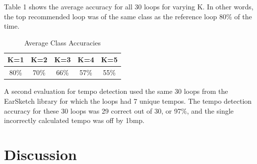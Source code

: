 \documentclass{article}
\begin{document}
Table 1 shows the average accuracy for all 30 loops for varying K. In other words, the top recommended loop was of the same class as the reference loop 80\% of the time.

\begin{table}[h!]
  \begin{center}
    \begin{tabular}{| c | c | c | c | c |}
    \hline
    K=1 & K=2 & K=3 & K=4 & K=5 \\
    \hline
    80\% & 70\% & 66\%  & 57\% & 55\% \\
    \hline
    \end{tabular}
  \end{center}
  \caption{Average Class Accuracies}
\end{table}

A second evaluation for tempo detection used the same 30 loops from the EarSketch library for which the loops had 7 unique tempos. The tempo detection accuracy for these 30 loops was 29 correct out of 30, or 97\%, and the single incorrectly calculated tempo was off by 1bmp.


\section{Discussion}


%
%
%
\end{document}
